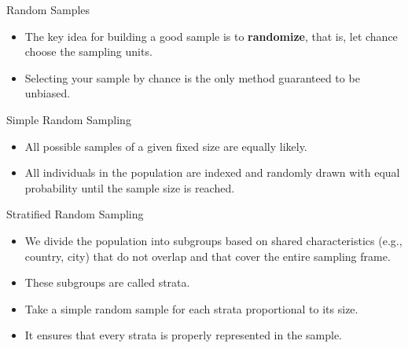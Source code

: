 \documentclass[handout]{beamer}
\begin{document}
\begin{frame}{Random Samples}
\scriptsize{

\begin{itemize}

 \item The key idea for building a good sample is to \textbf{randomize}, that is, let chance choose the sampling units.
 \item Selecting your sample by chance is the only method guaranteed to be unbiased.
\end{itemize}


\begin{block}{Simple Random Sampling}
 \begin{itemize}
 \item All possible samples of a given fixed size are equally likely.
 \item All individuals in the population are indexed and randomly drawn with equal probability until the sample size is reached.
\end{itemize}
\end{block}


\begin{block}{Stratified Random Sampling}
 \begin{itemize}
 \item We divide the population into subgroups based on shared characteristics (e.g., country, city) that do not overlap and that cover the entire sampling frame.
 \item These subgroups are called strata.
 \item Take a simple random sample for each strata proportional to its size.
 \item It ensures that every strata is properly represented in the sample.
\end{itemize}
\end{block}





} 
\end{frame}
\end{document}
